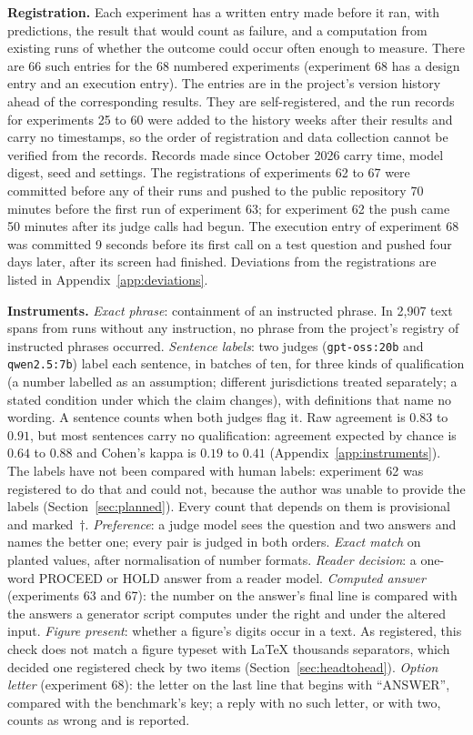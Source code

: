 \documentclass[10pt,twocolumn]{article}
\begin{document}
\textbf{Registration.} Each experiment has a written entry made before
it ran, with predictions, the result that would count as failure, and a
computation from existing runs of whether the outcome could occur
often enough to measure. There are 66 such entries for the 68 numbered
experiments (experiment 68 has a design entry and an execution entry). The entries are in the project's version history ahead of
the corresponding results. They are self-registered, and the run
records for experiments 25 to 60 were added to the history weeks after
their results and carry no timestamps, so the order of registration and
data collection cannot be verified from the records. Records made since
October 2026 carry time, model digest, seed and settings. The
registrations of experiments 62 to 67 were committed before any of
their runs and pushed to the public repository 70 minutes before the
first run of experiment 63; for experiment 62 the push came 50 minutes
after its judge calls had begun. The execution entry of experiment 68
was committed 9 seconds before its first call on a test question and
pushed four days later, after its screen had finished. Deviations from
the registrations are listed in Appendix~\ref{app:deviations}.

\textbf{Instruments.} \emph{Exact phrase}: containment of an instructed
phrase. In 2{,}907 text spans from runs without any instruction, no
phrase from the project's registry of instructed phrases occurred.
\emph{Sentence labels}: two judges (\texttt{gpt-oss:20b} and
\texttt{qwen2.5:7b}) label each sentence, in batches of ten, for three
kinds of qualification (a number labelled as an assumption; different
jurisdictions treated separately; a stated condition under which the
claim changes), with definitions that name no wording. A sentence
counts when both judges flag it. Raw agreement is $0.83$ to $0.91$, but
most sentences carry no qualification: agreement expected by chance is
$0.64$ to $0.88$ and Cohen's kappa \cite{cohen1960kappa} is $0.19$ to
$0.41$ (Appendix~\ref{app:instruments}). The labels have not been
compared with human labels: experiment 62 was registered to do that and
could not, because the author was unable to provide the labels
(Section~\ref{sec:planned}). Every count that depends on them is
provisional and marked~$\dagger$. \emph{Preference}: a judge model sees
the question and two answers and names the better one; every pair is
judged in both orders. \emph{Exact match} on planted values, after
normalisation of number formats. \emph{Reader decision}: a one-word
PROCEED or HOLD answer from a reader model. \emph{Computed answer}
(experiments 63 and 67): the number on the answer's final line is
compared with the answers a generator script computes under the right
and under the altered input. \emph{Figure present}: whether a figure's
digits occur in a text. As registered, this check does not match a
figure typeset with LaTeX thousands separators, which decided one
registered check by two items (Section~\ref{sec:headtohead}).
\emph{Option letter} (experiment 68): the letter on the last line that
begins with ``ANSWER'', compared with the benchmark's key; a reply with
no such letter, or with two, counts as wrong and is reported.
\end{document}
